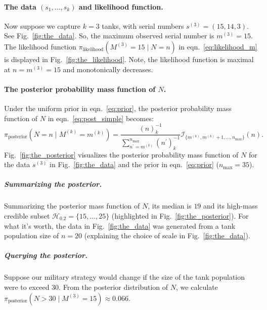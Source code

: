 \documentclass[11pt, oneside]{article}
\newcommand{\data}{$(s_1, ..., s_k)$\xspace}
\begin{document}
\paragraph{The data \data and likelihood function.} Now suppose we capture $k=3$ tanks, with serial numbers $s^{(3)}=(15, 14, 3)$. See Fig.~\ref{fig:the_data}. So, the maximum observed serial number is $m^{(3)}=15$. 
The likelihood function $\pi_{\text{likelihood}}(M^{(3)}=15 \mid N=n)$ in eqn.~\ref{eq:likelihood_m} is displayed in Fig.~\ref{fig:the_likelihood}. Note, the likelihood function is maximal at $n=m^{(3)}=15$ and monotonically decreases. 

\paragraph{The posterior probability mass function of $N$.}
Under the uniform prior in eqn.~\ref{eq:prior}, the posterior probability mass function of $N$ in eqn.~\ref{eq:post_simple} becomes:
\begin{equation}
	\pi_{\text{posterior}}(N=n \mid M^{(k)}=m^{(k)})= 
		\dfrac{
			(n)_k^{-1}
			}{
			\displaystyle \sum_{ n^\prime = m^{(k)}}^{n_{\text{max}}} (n^\prime)_k^{-1}
		} \mathcal{I}_{ \{m^{(k)}, m^{(k)}+1, ..., n_\text{max}\} }(n).
\end{equation}
Fig.~\ref{fig:the_posterior} visualizes the posterior probability mass function of $N$ for the data $s^{(3)}$ in Fig.~\ref{fig:the_data} and the prior in eqn.~\ref{eq:prior} ($n_\text{max}=35$). 

\subparagraph{Summarizing the posterior.}
Summarizing the posterior mass function of $N$, its median is $19$ and its high-mass credible subset $\mathcal{H}_{0.2}=\{15, ..., 25\}$ (highlighted in Fig.~\ref{fig:the_posterior}). 
For what it's worth, the data in Fig.~\ref{fig:the_data} was generated from a tank population size of $n=20$ (explaining the choice of scale in Fig.~\ref{fig:the_data}). 

\subparagraph{Querying the posterior.} Suppose our military strategy would change if the size of the tank population were to exceed 30. From the posterior distribution of $N$, we calculate $\pi_{\text{posterior}}(N>30 \mid M^{(3)}=15)\approx 0.066$.

\end{document}
